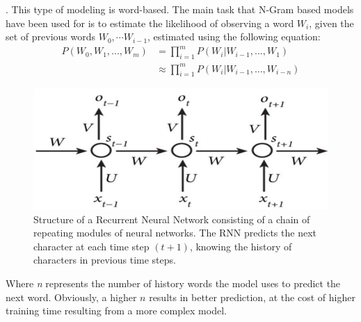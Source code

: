 . 
This type of modeling is word-based.
The main task that N-Gram based models \cite{brown1992class} have been used for is to estimate the likelihood of observing a word \textit{$W_i$}, given the set of previous words ${W_0, \cdots W_{i-1}}$, estimated using the following equation:
\newline
\begin{equation}
\begin{aligned}
  P(W_0, W_1, ..., W_{m}) &= \prod_{i=1}^{m}  P(W_{i} |  W_{i-1}, ..., W_{1}) \\
  &\approx \prod_{i=1}^{m}  P(W_{i} |  W_{i-1}, ..., W_{i-n})
  \end{aligned}
\end{equation}
\begin{figure}
  \includegraphics[width=\linewidth]{figs/Background_RNN}
  \caption{Structure of a Recurrent Neural Network consisting of a chain of repeating modules of neural networks. The RNN predicts the next character at each time step $(t+1)$, knowing the history of characters in previous time steps.}
\label{fig:RNN}
\end{figure}
Where \textit{n} represents the number of history words the model uses to predict the next word. Obviously, a higher $n$ results in better prediction, at the cost of higher training time resulting from a more complex model.  

